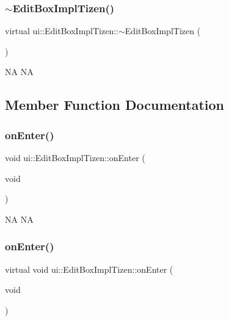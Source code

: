 \subsubsection{\texorpdfstring{$\sim$\+Edit\+Box\+Impl\+Tizen()}{~EditBoxImplTizen()}\hspace{0.1cm}{\footnotesize\ttfamily [2/2]}}
{\footnotesize\ttfamily virtual ui\+::\+Edit\+Box\+Impl\+Tizen\+::$\sim$\+Edit\+Box\+Impl\+Tizen (\begin{DoxyParamCaption}{ }\end{DoxyParamCaption})\hspace{0.3cm}{\ttfamily [virtual]}}

NA  NA 

\subsection{Member Function Documentation}
\mbox{\label{classui_1_1EditBoxImplTizen_a92fc78c9eb060713992b8dc4f61e8f32}} 
\subsubsection{\texorpdfstring{on\+Enter()}{onEnter()}\hspace{0.1cm}{\footnotesize\ttfamily [1/2]}}
{\footnotesize\ttfamily void ui\+::\+Edit\+Box\+Impl\+Tizen\+::on\+Enter (\begin{DoxyParamCaption}\item[{void}]{ }\end{DoxyParamCaption})\hspace{0.3cm}{\ttfamily [virtual]}}

NA  NA \mbox{\label{classui_1_1EditBoxImplTizen_ac04445d2c58f2610e8c3e7ee6d68f5e5}} 
\subsubsection{\texorpdfstring{on\+Enter()}{onEnter()}\hspace{0.1cm}{\footnotesize\ttfamily [2/2]}}
{\footnotesize\ttfamily virtual void ui\+::\+Edit\+Box\+Impl\+Tizen\+::on\+Enter (\begin{DoxyParamCaption}\item[{void}]{ }\end{DoxyParamCaption})\hspace{0.3cm}{\ttfamily [virtual]}}

